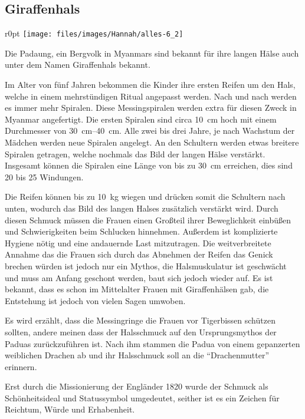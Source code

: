 \subsection{Giraffenhals}
\begin{wrapfigure}{r}{0pt}
	\texttt{[image: files/images/Hannah/alles-6\_2]}%
\end{wrapfigure}

Die Padaung, ein Bergvolk in Myanmars sind bekannt für ihre langen Hälse auch unter dem Namen
Giraffenhals bekannt.

Im Alter von fünf Jahren bekommen die Kinder ihre ersten Reifen um den Hals, welche in einem
mehrstündigen Ritual angepasst werden. Nach und nach werden es immer mehr Spiralen.
Diese Messingspiralen werden extra für diesen Zweck in Myanmar
angefertigt. Die ersten Spiralen sind circa \SI{10}{\centi\metre} hoch mit einem Durchmesser von
\SIrange{30}{40}{\centi\metre}. Alle zwei bis drei Jahre, je nach Wachstum der Mädchen werden neue
Spiralen angelegt. An den Schultern werden etwas breitere Spiralen getragen, welche nochmals das Bild
der langen Hälse verstärkt. Insgesamt können die Spiralen eine Länge von bis zu \SI{30}{\centi\metre}
erreichen, dies sind 20 bis 25 Windungen.

Die Reifen können bis zu \SI{10}{\kilo\gram} wiegen und drücken somit die Schultern nach unten,
wodurch das Bild des langen Halses zusätzlich verstärkt wird.
Durch diesen Schmuck müssen die Frauen einen Großteil ihrer
Beweglichkeit einbüßen und Schwierigkeiten beim Schlucken hinnehmen. Außerdem ist komplizierte
Hygiene nötig und
eine andauernde Last mitzutragen. Die weitverbreitete Annahme das die Frauen sich durch das Abnehmen
der Reifen das Genick brechen würden ist jedoch nur ein Mythos, die Halsmuskulatur ist geschwächt und
muss am Anfang geschont werden, baut sich jedoch wieder auf. Es ist bekannt, dass es schon im
Mittelalter Frauen mit Giraffenhälsen gab, die Entstehung ist jedoch von vielen Sagen umwoben.

Es wird erzählt, dass die Messingringe die Frauen vor Tigerbissen schützen sollten, andere meinen
dass der Halsschmuck auf den Ursprungsmythos der Paduas zurückzuführen ist. Nach ihm stammen die
Padua von einem gepanzerten weiblichen Drachen ab und ihr Halsschmuck soll an die \enquote{Drachenmutter}
erinnern.

Erst durch die Missionierung der Engländer 1820 wurde der Schmuck als Schönheitsideal und
Statussymbol umgedeutet,
seither ist es ein Zeichen für Reichtum, Würde und Erhabenheit.

